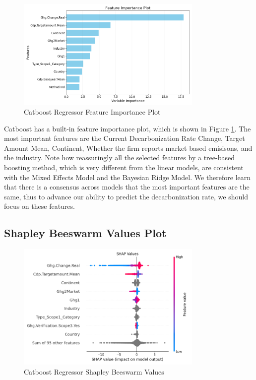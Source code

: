 \begin{figure}[H]
    \centering
    \includegraphics[width=0.8\textwidth]{figures/catboost_feature_importance.png}
    \caption{Catboost Regressor Feature Importance Plot}
    \label{fig:catboost_feature_importance}
\end{figure}
\noindent Catboost has a built-in feature importance plot, which is shown in Figure \ref{fig:catboost_feature_importance}. The most important features are the Current Decarbonization Rate Change, Target Amount Mean, Continent, Whether the firm reports market based emisisons, and the industry. Note how reassuringly all the selected features by a tree-based boosting method, which is very different from the linear models, are consistent with the Mixed Effects Model and the Bayesian Ridge Model. We therefore learn that there is a consensus across models that the most important features are the same, thus to advance our ability to predict the decarbonization rate, we should focus on these features.


\subsection{Shapley Beeswarm Values Plot}

\begin{figure}[H]
    \centering
    \includegraphics[width=0.8\textwidth]{figures/catboost_shap_values_beeswarm.png}
    \caption{Catboost Regressor Shapley Beeswarm Values}
    \label{fig:catboost_shapley_values}
\end{figure}


